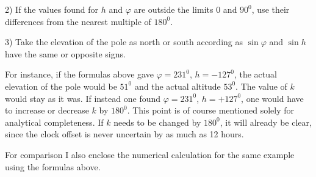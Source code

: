2) If the values found for $h$ and $\varphi$ are outside the limits $0$ and $90^0$, use their differences from the nearest multiple of $180^0$.

3) Take the elevation of the pole as north or south according as $\sin\varphi$ and $\sin h$ have the same or opposite signs.

For instance, if the formulas above gave $\varphi=231^0$, $h=-127^0$, the actual elevation of the pole would be $51^0$ and the actual altitude $53^0$. The value of $k$ would stay as it was. If instead one found $\varphi=231^0$, $h=+127^0$, one would have to increase or decrease $k$ by $180^0$. This point is of course mentioned solely for analytical completeness. If $k$ needs to be changed by $180^0$, it will already be clear, since the clock offset is never uncertain by as much as 12 hours.

For comparison I also enclose the numerical calculation for the same example using the formulas above.


